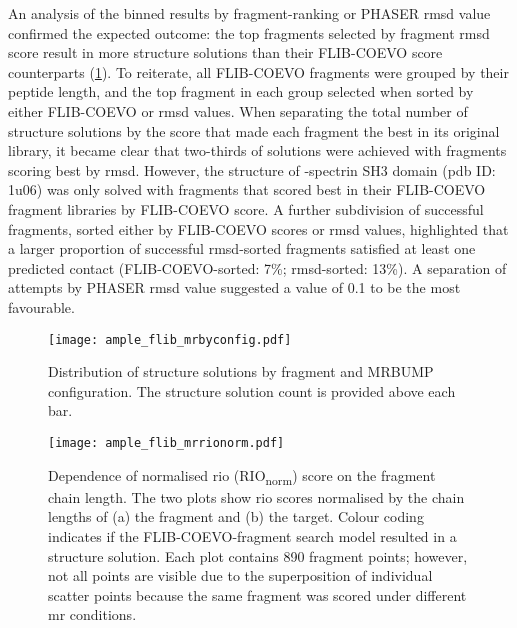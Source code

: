 An analysis of the binned results by fragment-ranking or PHASER \gls{rmsd} value confirmed the expected outcome: the top fragments selected by fragment \gls{rmsd} score result in more structure solutions than their FLIB-COEVO score counterparts (\cref{fig:ample_flib_mrbyconfig}). To reiterate, all FLIB-COEVO fragments were grouped by their peptide length, and the top fragment in each group selected when sorted by either FLIB-COEVO or \gls{rmsd} values. When separating the total number of structure solutions by the score that made each fragment the best in its original library, it became clear that two-thirds of solutions were achieved with fragments scoring best by \gls{rmsd}. However, the structure of \textalpha-spectrin SH3 domain (\gls{pdb} ID: 1u06) was only solved with fragments that scored best in their FLIB-COEVO fragment libraries by FLIB-COEVO score. A further subdivision of successful fragments, sorted either by FLIB-COEVO scores or \gls{rmsd} values, highlighted that a larger proportion of successful \gls{rmsd}-sorted fragments satisfied at least one predicted contact (FLIB-COEVO-sorted: 7\%; \gls{rmsd}-sorted: 13\%). A separation of attempts by PHASER \gls{rmsd} value suggested a value of 0.1 to be the most favourable.

\begin{figure}[H]
	\centering
	\texttt{[image: ample\_flib\_mrbyconfig.pdf]}
	\caption[MR structure solutions by input parameters]{Distribution of structure solutions by fragment and MRBUMP configuration. The structure solution count is provided above each bar.}
	\label{fig:ample_flib_mrbyconfig}
\end{figure}

\begin{figure}[H]
	\centering
	\texttt{[image: ample\_flib\_mrrionorm.pdf]}
	\caption[Relationship between fragment chain length and RIO scores]{Dependence of normalised \acrlong{rio} (RIO\textsubscript{norm}) score on the fragment chain length. The two plots show  \gls{rio} scores normalised by the chain lengths of (a) the fragment and (b) the target. Colour coding indicates if the FLIB-COEVO-fragment search model resulted in a structure solution. Each plot contains 890 fragment points; however, not all points are visible due to the superposition of individual scatter points because the same fragment was scored under different \gls{mr} conditions.}
	\label{fig:ample_flib_mrrionorm}
\end{figure}

